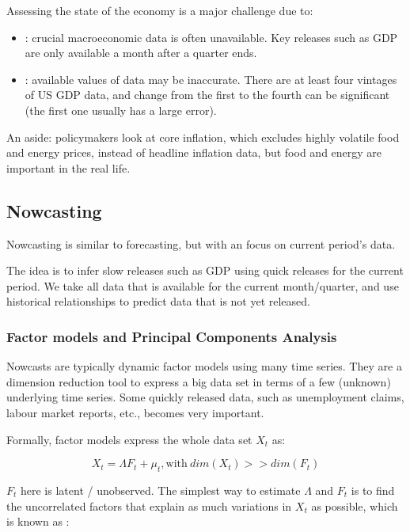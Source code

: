         Assessing the state of the economy is a major challenge due to:
        \begin{itemize}
            \item {}: crucial macroeconomic data is often unavailable. Key releases such as GDP are only available a month after a quarter ends.
            \item {}: available values of data may be inaccurate. There are at least four vintages of US GDP data, and change from the first to the fourth can be significant (the first one usually has a large error).
        \end{itemize}
        
        An aside: policymakers look at core inflation, which excludes highly volatile food and energy prices, instead of headline inflation data, but food and energy are important in the real life.
        
    \subsection{Nowcasting}

        Nowcasting is similar to forecasting, but with an focus on current period's data. 
        
        The idea is to infer slow releases such as GDP using quick releases for the current period. We take all data that is available for the current month/quarter, and use historical relationships to predict data that is not yet released.

        \subsubsection{Factor models and Principal Components Analysis}

            Nowcasts are typically dynamic factor models using many time series. They are a dimension reduction tool to express a big data set in terms of a few (unknown) underlying time series. Some quickly released data, such as unemployment claims, labour market reports, etc., becomes very important.

            Formally, factor models express the whole data set $X_t$ as:
            
            $$X_t = \Lambda F_t + \mu_t, \text{with}\ dim(X_t) >> dim(F_t)$$

            $F_t$ here is latent / unobserved. The simplest way to estimate $\Lambda$ and $F_t$ is to find the uncorrelated factors that explain as much variations in $X_t$ as possible, which is known as :

